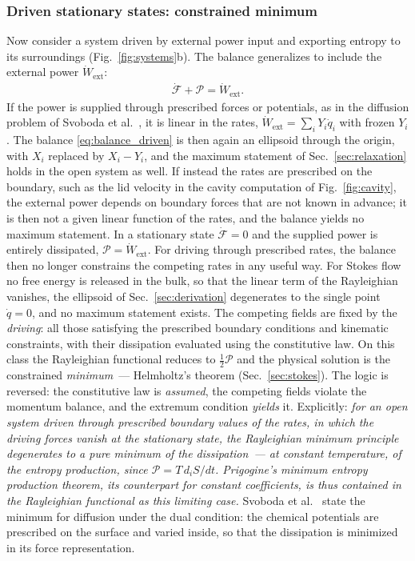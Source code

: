 \documentclass[aip,pof,reprint,amsmath,amssymb,longbibliography]{revtex4-2}
\begin{document}
\subsubsection{Driven stationary states: constrained minimum}
\label{sec:driven}

Now consider a system driven by external power input and exporting entropy to its surroundings (Fig.~\ref{fig:systems}b). The balance generalizes to include the external power $\dot{W}_{\text{ext}}$:
\begin{align}
    \dot{\mathcal{F}} + \mathcal{P} = \dot{W}_{\text{ext}}. \label{eq:balance_driven}
\end{align}
If the power is supplied through prescribed forces or potentials, as in the diffusion problem of Svoboda et al.\ \cite{svoboda2023note}, it is linear in the rates, $\dot{W}_{\text{ext}} = \sum_i Y_i \dot{q}_i$ with frozen $Y_i$. The balance \eqref{eq:balance_driven} is then again an ellipsoid through the origin, with $X_i$ replaced by $X_i - Y_i$, and the maximum statement of Sec.~\ref{sec:relaxation} holds in the open system as well. If instead the rates are prescribed on the boundary, such as the lid velocity in the cavity computation of Fig.~\ref{fig:cavity}, the external power depends on boundary forces that are not known in advance; it is then not a given linear function of the rates, and the balance yields no maximum statement. In a stationary state $\dot{\mathcal{F}} = 0$ and the supplied power is entirely dissipated, $\mathcal{P} = \dot{W}_{\text{ext}}$. For driving through prescribed rates, the balance then no longer constrains the competing rates in any useful way. For Stokes flow no free energy is released in the bulk, so that the linear term of the Rayleighian vanishes, the ellipsoid of Sec.~\ref{sec:derivation} degenerates to the single point $\dot{q} = 0$, and no maximum statement exists. The competing fields are fixed by the \textit{driving}: all those satisfying the prescribed boundary conditions and kinematic constraints, with their dissipation evaluated using the constitutive law. On this class the Rayleighian functional reduces to $\tfrac{1}{2}\mathcal{P}$ and the physical solution is the constrained \textit{minimum}~--- Helmholtz's theorem (Sec.~\ref{sec:stokes}). The logic is reversed: the constitutive law is \textit{assumed}, the competing fields violate the momentum balance, and the extremum condition \textit{yields} it. Explicitly: \textit{for an open system driven through prescribed boundary values of the rates, in which the driving forces vanish at the stationary state, the Rayleighian minimum principle degenerates to a pure minimum of the dissipation~--- at constant temperature, of the entropy production, since $\mathcal{P} = T\, d_i S/dt$. Prigogine's minimum entropy production theorem, its counterpart for constant coefficients, is thus contained in the Rayleighian functional as this limiting case.} Svoboda et al.\ \cite{svoboda2023note} state the minimum for diffusion under the dual condition: the chemical potentials are prescribed on the surface and varied inside, so that the dissipation is minimized in its force representation.
\end{document}
